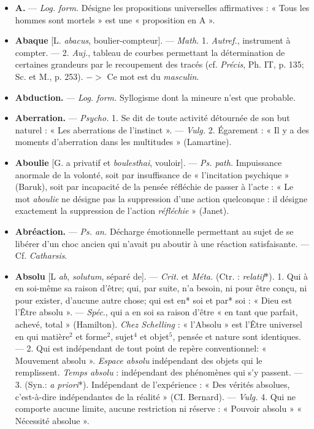 
	\begin{itemize}[leftmargin=1cm, label=, itemsep=1pt]

\item {\bf A.}  — \textsf{\textit {Log. form.}} Désigne les propositions universelles
affirmatives :
« Tous les hommes sont mortels »
est une « proposition en A ».

\item {\bf Abaque} [L. {\it abacus}, boulier-compteur].
— \textsf{\textit {Math.}} 1. {\it Autref.}, instrument
à compter. — 2. {\it Auj.}, tableau
de courbes permettant la détermination
de certaines grandeurs par
le recoupement des tracés (cf. {\it Précis},
Ph. IT, p. 135; Sc. et M., p. 253).
$->$ Ce mot est du {\it masculin}.

\item {\bf Abduction.} — \textsf{\textit {Log. form.}} Syllogisme
dont la mineure n’est que probable.

\item {\bf Aberration.} — \textsf{\textit {Psycho.}} 1. Se dit de
toute activité détournée de son but
naturel : « Les aberrations de l’instinct ».
— \textsf{\textit {Vulg.}} 2. Égarement : « Il
y a des moments d’aberration dans
les multitudes » (Lamartine).


\item {\bf Aboulie} [G. a privatif et {\it boulesthai},
vouloir]. — \textsf{\textit {Ps. path.}} Impuissance
anormale de la volonté, soit par
insuffisance de « l'incitation psychique »
(Baruk), soit par incapacité
de la pensée réfléchie de passer à
l'acte : « Le mot {\it aboulie} ne désigne
pas la suppression d’une action quelconque :
il désigne exactement la
suppression de l’action {\it réfléchie} »
(Janet).

\item {\bf Abréaction.} — \textsf{\textit {Ps. an.}} Décharge émotionnelle
permettant au sujet de se
libérer d’un choc ancien qui n'avait
pu aboutir à une réaction satisfaisante.
— Cf. {\it Catharsis}.

\item {\bf Absolu} [L {\it ab}, {\it solutum}, séparé de].
— \textsf{\textit {Crit.}} et \textsf{\textit {Méta.}} (Ctr. : {\it relatif}*).
1. Qui à en soi-même sa raison
d’être; qui, par suite, n’a besoin, ni
pour être conçu, ni pour exister,
d'aucune autre chose; qui est en*
soi et par* soi : « Dieu est l'Être
absolu ». — {\it Spéc}., qui a en soi sa
raison d’être « en tant que parfait,
achevé, total » (Hamilton). {\it Chez
Schelling} : « l'Absolu » est l’Être
universel en qui matière$^2$ et forme$^2$,
sujet$^4$ et objet$^5$, pensée et nature
sont identiques. — 2. Qui est indépendant
de tout point de repère
conventionnel: « Mouvement absolu ».
{\it Espace absolu} indépendant des
objets qui le remplissent. {\it Temps
absolu} : indépendant des phénomènes
qui s’y passent. — 3. (Syn.: {\it a priori}*).
Indépendant de l'expérience : « Des
vérités absolues, c’est-à-dire indépendantes
de la réalité » (CI. Bernard).
— \textsf{\textit {Vulg.}} 4. Qui ne comporte
aucune limite, aucune restriction
ni réserve : « Pouvoir absolu »
« Nécessité absolue ».


\end{itemize}

